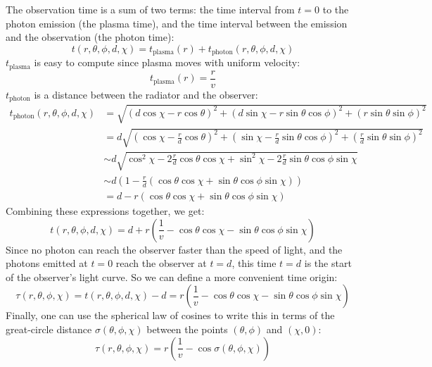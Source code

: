 \documentclass[manuscript]{aastex}
\begin{document}
The observation time is a sum of two terms: the time interval from $t
= 0$ to the photon emission (the plasma time), and the time interval
between the emission and the observation (the photon time):
\begin{equation*}
t\left(r, \theta, \phi, d, \chi\right) = t_\text{plasma}\left(r\right) + t_\text{photon}\left(r, \theta, \phi, d, \chi\right)
\end{equation*}
$t_\text{plasma}$ is easy to compute since plasma moves with uniform velocity:
\begin{equation*}
t_\text{plasma}\left(r\right) = \frac{r}{v}
\end{equation*}
$t_\text{photon}$ is a distance between the radiator and the observer:
\begin{align*}
t_\text{photon}\left(r, \theta, \phi, d, \chi\right) &= \sqrt{
	\left( d \cos\chi - r \cos\theta \right)^2 +
	\left( d \sin\chi - r \sin\theta \cos\phi \right)^2 +
	\left( r \sin\theta \sin\phi \right)^2
} \\
&= d\sqrt{
	\left( \cos\chi - \frac{r}{d} \cos\theta \right)^2 +
	\left( \sin\chi - \frac{r}{d} \sin\theta \cos\phi \right)^2 +
	\left(\frac{r}{d} \sin\theta \sin\phi \right)^2
} \\
&\sim d\sqrt{
	\cos^2{\chi} - 2\frac{r}{d} \cos\theta \cos\chi + \sin^2\chi - 2\frac{r}{d} \sin\theta \cos\phi \sin\chi
} \\
&\sim d\left(
	1 - 
	\frac{r}{d} \left( \cos\theta \cos\chi + \sin\theta \cos\phi \sin\chi \right)
\right) \\
&= d - r\left( \cos\theta \cos\chi + \sin\theta \cos\phi \sin\chi \right)
\end{align*}
Combining these expressions together, we get:
\begin{equation*}
t\left(r, \theta, \phi, d, \chi\right) = d + r\left( \frac{1}{v} - \cos\theta \cos\chi - \sin\theta \cos\phi \sin\chi \right)
\end{equation*}
Since no photon can reach the observer faster than the speed of light, and the photons emitted at $t = 0$ reach the observer at $t = d$, this time $t = d$ is the start of the observer's light curve. So we can define a more convenient time origin:
\begin{equation*}
\tau \left(r, \theta, \phi, \chi\right) = t\left(r, \theta, \phi, d, \chi\right) - d = r\left( \frac{1}{v} - \cos\theta \cos\chi - \sin\theta \cos\phi \sin\chi \right)
\end{equation*}
Finally, one can use the spherical law of cosines to write this in terms of the great-circle distance $\sigma\left( \theta, \phi, \chi \right)$ between the points $\left( \theta, \phi \right)$ and $\left( \chi, 0 \right)$:
\begin{equation}
\tau \left(r, \theta, \phi, \chi\right) = r\left( \frac{1}{v} - \cos\sigma\left( \theta, \phi, \chi \right) \right)
\end{equation}
\end{document}
